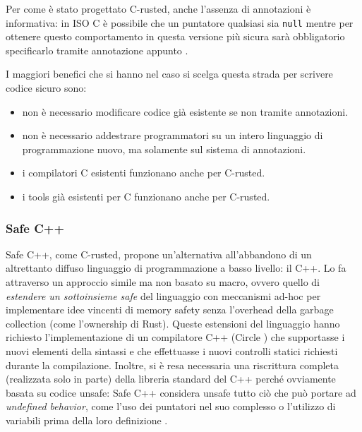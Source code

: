 Per come è stato progettato C-rusted, anche l'assenza di annotazioni è informativa: in ISO C è possibile che un puntatore qualsiasi sia \texttt{null} mentre per ottenere questo comportamento in questa versione più sicura sarà obbligatorio specificarlo tramite annotazione appunto \cite{bagnara2023crustedadvantagesrustc}.

I maggiori benefici che si hanno nel caso si scelga questa strada per scrivere codice sicuro sono:
\begin{itemize}
    \item non è necessario modificare codice già esistente se non tramite annotazioni. 
    \item non è necessario addestrare programmatori su un intero linguaggio di programmazione nuovo, ma solamente sul sistema di annotazioni.
    \item i compilatori C esistenti funzionano anche per C-rusted.
    \item i tools già esistenti per C funzionano anche per C-rusted.
\end{itemize}


\subsubsection{Safe C++}
Safe C++, come C-rusted, propone un'alternativa all'abbandono di un altrettanto diffuso linguaggio di programmazione a basso livello: il C++. Lo fa attraverso un approccio simile ma non basato su macro, ovvero quello di \textit{estendere un sottoinsieme safe} del linguaggio con meccanismi ad-hoc per implementare idee vincenti di memory safety senza l'overhead della garbage collection (come l'ownership di Rust). Queste estensioni del linguaggio hanno richiesto l'implementazione di un compilatore C++ (Circle \cite{Circle}) che supportasse i nuovi elementi della sintassi e che effettuasse i nuovi controlli statici richiesti durante la compilazione. Inoltre, si è resa necessaria una riscrittura completa (realizzata solo in parte) della libreria standard del C++ perché ovviamente basata su codice unsafe: Safe C++ considera unsafe tutto ciò che può portare ad \textit{undefined behavior}, come l'uso dei puntatori nel suo complesso o l'utilizzo di variabili prima della loro definizione \cite{SAFEC++}.

